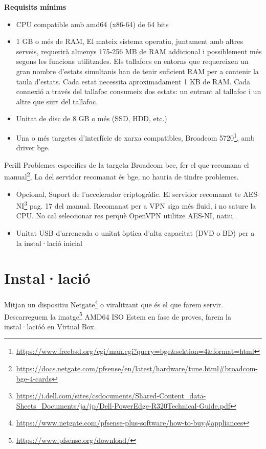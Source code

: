 \documentclass[
  10pt,
]{krantz}
\DeclareRobustCommand{\href}[2]{#2\footnote{\url{#1}}}
\begin{document}
\textbf{Requisits mínims}

\begin{itemize}
\item
  CPU compatible amb amd64 (x86-64) de 64 bits
\item
  1 GB o més de RAM, El mateix sistema operatiu, juntament amb altres serveis, requerirà almenys 175-256 MB de RAM addicional i possiblement més segons les funcions utilitzades. Els tallafocs en entorns que requereixen un gran nombre d'estats simultanis han de tenir suficient RAM per a contenir la taula d'estats. Cada estat necessita aproximadament 1 KB de RAM. Cada connexió a través del tallafoc consumeix dos estats: un entrant al tallafoc i un altre que surt del tallafoc.
\item
  Unitat de disc de 8 GB o més (SSD, HDD, etc.)
\item
  Una o més targetes d'interfície de xarxa compatibles, \href{https://www.freebsd.org/cgi/man.cgi?query=bge\&sektion=4\&format=html}{Broadcom 5720}, amb driver bge.
\end{itemize}

\begin{rmdwarn}{Perill}
Problemes específics de la targeta Broadcom bce, fer el que recomana el \href{https://docs.netgate.com/pfsense/en/latest/hardware/tune.html\#broadcom-bge-4-cards}{manual}, La del servidor recomanat és bge, no hauria de tindre problemes.

\end{rmdwarn}

\begin{itemize}
\item
  Opcional, Suport de l'accelerador criptogràfic. El servidor recomanat te \href{https://i.dell.com/sites/csdocuments/Shared-Content_data-Sheets_Documents/ja/jp/Dell-PowerEdge-R320Technical-Guide.pdf}{AES-NI} pag. 17 del manual. Recomanat per a VPN siga més fluid, i no sature la CPU. No cal seleccionar res perquè OpenVPN utilitze AES-NI, natiu.
\item
  Unitat USB d'arrencada o unitat òptica d'alta capacitat (DVD o BD) per a la instal·lació inicial
\end{itemize}

\hypertarget{installaciuxf3}{%
\section{Instal·lació}\label{installaciuxf3}}

Mitjan un dispositiu \href{https://www.netgate.com/pfsense-plus-software/how-to-buy\#appliances}{Netgate} o viralitzant que és el que farem servir. Descarreguem la \href{https://www.pfsense.org/download/}{imatge} AMD64 ISO Estem en fase de proves, farem la instal·lacióó en Virtual Box.
\end{document}
